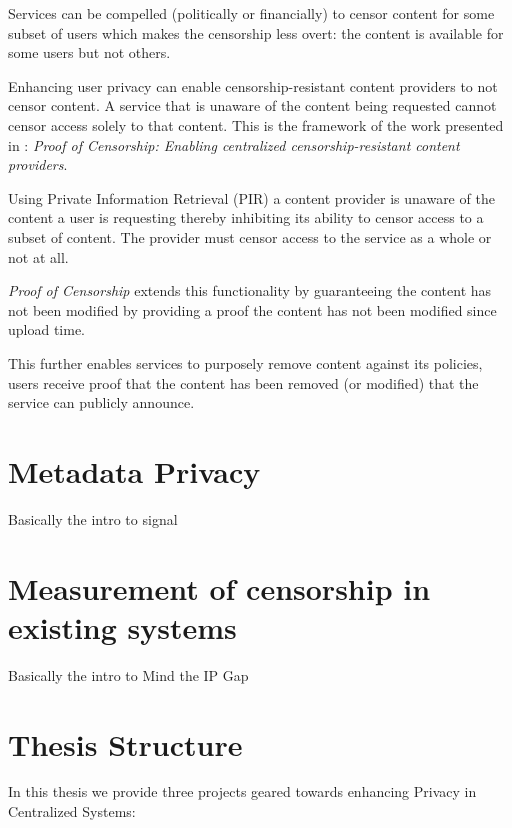 Services can be compelled (politically or financially) to censor content for
some subset of users which makes the censorship less overt: the content is
available for some users but not others. 

Enhancing user privacy can enable censorship-resistant content providers to not
censor content. A service that is unaware of the content being requested cannot
censor access solely to that content. This is the framework of the work
presented in : \emph{Proof of Censorship: Enabling centralized
censorship-resistant content providers}.

Using Private Information Retrieval (PIR) a content provider is unaware of the
content a user is requesting thereby inhibiting its ability to censor access to
a subset of content. The provider must censor access to the service as a whole
or not at all.

\emph{Proof of Censorship} extends this functionality by guaranteeing the
content has not been modified by providing a proof the content has not been
modified since upload time.

This further enables services to purposely remove content against its policies,
users receive proof that the content has been removed (or modified) that the
service can publicly announce.

\section{Metadata Privacy}
Basically the intro to signal

\section{Measurement of censorship in existing systems}
Basically the intro to Mind the IP Gap

\section{Thesis Structure}
In this thesis we provide three projects geared towards enhancing Privacy in
Centralized Systems:

